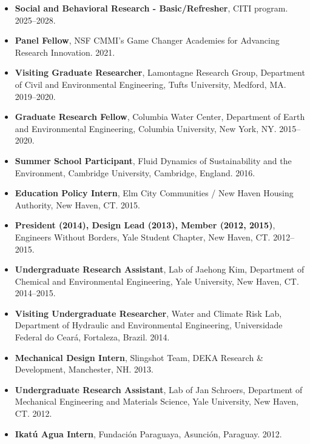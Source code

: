 \documentclass[10pt,oneside]{article}
\begin{document}
\begin{itemize}[label={}]
  
  \item \textbf{Social and Behavioral Research - Basic/Refresher}, CITI program. 2025--2028.
  
  \item \textbf{Panel Fellow}, NSF CMMI's Game Changer Academies for Advancing Research Innovation. 2021.
  
  \item \textbf{Visiting Graduate Researcher}, Lamontagne Research Group, Department of Civil and Environmental Engineering, Tufts University, Medford, MA. 2019--2020.
  
  \item \textbf{Graduate Research Fellow}, Columbia Water Center, Department of Earth and Environmental Engineering, Columbia University, New York, NY. 2015--2020.
  
  \item \textbf{Summer School Participant}, Fluid Dynamics of Sustainability and the Environment, Cambridge University, Cambridge, England. 2016.
  
  \item \textbf{Education Policy Intern}, Elm City Communities / New Haven Housing Authority, New Haven, CT. 2015.
  
  \item \textbf{President (2014), Design Lead (2013), Member (2012, 2015)}, Engineers Without Borders, Yale Student Chapter, New Haven, CT. 2012--2015.
  
  \item \textbf{Undergraduate Research Assistant}, Lab of Jaehong Kim, Department of Chemical and Environmental Engineering, Yale University, New Haven, CT. 2014--2015.
  
  \item \textbf{Visiting Undergraduate Researcher}, Water and Climate Risk Lab, Department of Hydraulic and Environmental Engineering, Universidade Federal do Ceará, Fortaleza, Brazil. 2014.
  
  \item \textbf{Mechanical Design Intern}, Slingshot Team, DEKA Research \& Development, Manchester, NH. 2013.
  
  \item \textbf{Undergraduate Research Assistant}, Lab of Jan Schroers, Department of Mechanical Engineering and Materials Science, Yale University, New Haven, CT. 2012.
  
  \item \textbf{Ikatú Agua Intern}, Fundación Paraguaya, Asunción, Paraguay. 2012.
  
\end{itemize}
\end{document}
